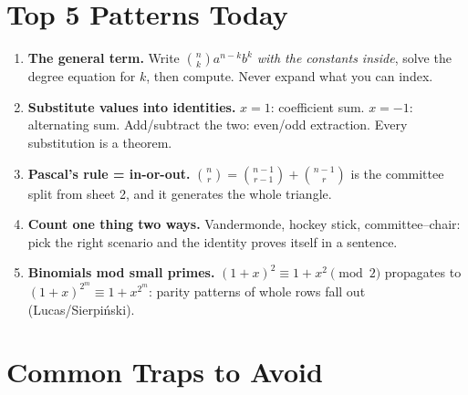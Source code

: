 \documentclass[11pt,a4paper]{article}
\begin{document}
\section*{Top 5 Patterns Today}

\begin{enumerate}[leftmargin=2em, itemsep=4pt]
  \item \textbf{The general term.} Write $\binom{n}{k}a^{n-k}b^k$ \emph{with the constants inside}, solve the degree equation for $k$, then compute. Never expand what you can index. 
  \item \textbf{Substitute values into identities.} $x=1$: coefficient sum. $x=-1$: alternating sum. Add/subtract the two: even/odd extraction. Every substitution is a theorem. 
  \item \textbf{Pascal's rule = in-or-out.} $\binom{n}{r}=\binom{n-1}{r-1}+\binom{n-1}{r}$ is the committee split from sheet 2, and it generates the whole triangle. 
  \item \textbf{Count one thing two ways.} Vandermonde, hockey stick, committee--chair: pick the right scenario and the identity proves itself in a sentence. 
  \item \textbf{Binomials mod small primes.} $(1+x)^2\equiv1+x^2\pmod2$ propagates to $(1+x)^{2^m}\equiv1+x^{2^m}$: parity patterns of whole rows fall out (Lucas/Sierpi\'nski). 
\end{enumerate}

\section*{Common Traps to Avoid}
\end{document}
